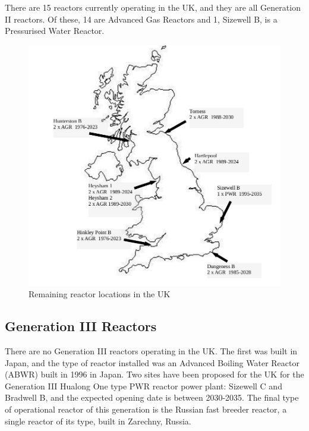There are 15 reactors currently operating in the UK, and they are all Generation II reactors.  Of these, 14 are Advanced Gas Reactors and 1, Sizewell B, is a Pressurised Water Reactor.

\begin{figure}[tbp]
  \begin{center}
    \includegraphics[width=12.0cm]{chapters/introduction/images/remaining_plants.png}
    \caption{Remaining reactor locations in the UK}
    \label{fig:electricityusagesuk}
  \end{center}
\end{figure}




\subsection{Generation III Reactors}

There are no Generation III reactors operating in the UK.  The first was built in Japan, and the type of reactor installed was an Advanced Boiling Water Reactor (ABWR) built in 1996 in Japan.  Two sites have been proposed for the UK for the Generation III Hualong One type PWR reactor power plant:  Sizewell C and Bradwell B, and the expected opening date is between 2030-2035.   The final type of operational reactor of this generation is the Russian fast breeder reactor, a single reactor of its type, built in Zarechny, Russia. 




